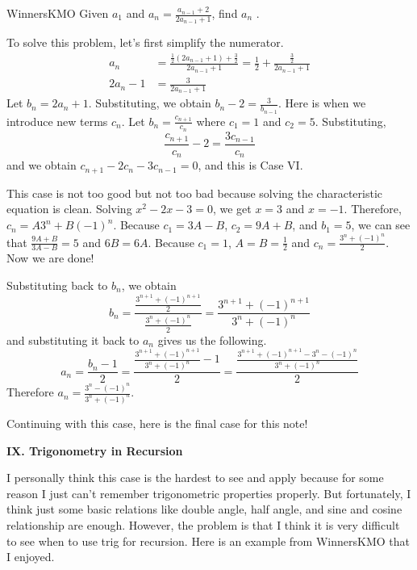 \documentclass[../../../main.tex]{subfiles}
\begin{document}
\begin{problem}{WinnersKMO}{}
Given $a_1$ and $a_n = \frac{a_{n-1} + 2}{2a_{n-1} + 1}$, find $a_n$
\cite{MATH01-5}.
\end{problem}
\begin{solution}
To solve this problem, let's first simplify the numerator.
\begin{align*}
    a_n
    &= \frac{ \frac{1}{2} (2a_{n-1} + 1) + \frac{3}{2} }{2a_{n-1} + 1}
    = \frac{1}{2} + \frac{\frac{3}{2}}{2a_{n-1} + 1} \\
    2a_n - 1 &= \frac{3}{2a_{n-1} + 1}
\end{align*}
Let $b_n = 2a_n + 1$. Substituting, we obtain $b_n - 2 =
\frac{3}{b_{n-1}}$. Here is when we introduce new terms $c_n$.
Let $b_n = \frac{c_{n+1}}{c_n}$ where $c_1 = 1$ and $c_2 = 5$.
Substituting,
\[
\frac{c_{n+1}}{c_n} - 2 = \frac{3c_{n-1}}{c_n}
\]
and we obtain $c_{n+1} - 2c_n - 3c_{n-1} = 0$, and this is Case VI.

This case is not too good but not too bad because solving the
characteristic equation is clean. Solving $x^2 - 2x - 3 = 0$,
we get $x = 3$ and $x = -1$. Therefore, $c_n = A3^n + B(-1)^n$.
Because $c_1 = 3A - B$, $c_2 = 9A + B$, and $b_1 = 5$, we can
see that $\frac{9A + B}{3A - B} = 5$ and $6B = 6A$.
Because $c_1 = 1$, $A = B = \frac{1}{2}$ and
$c_n = \frac{3^n + (-1)^n}{2}$. Now we are done!

Substituting back to $b_n$, we obtain
\[
b_n
= \frac{ \frac{3^{n+1} + (-1)^{n+1}}{2} }{ \frac{3^n + (-1)^n}{2} }
= \frac{3^{n+1} + (-1)^{n+1}}{3^n + (-1)^n}
\]
and substituting it back to $a_n$ gives us the following.
\[
a_n
= \frac{b_n - 1}{2}
= \frac{ \frac{3^{n+1} + (-1)^{n+1}}{3^n + (-1)^n} - 1 }{2}
= \frac{ \frac{3^{n+1} + (-1)^{n+1} - 3^n - (-1)^n}{3^n + (-1)^n} }{2}
\]
Therefore $a_n = \frac{3^n - (-1)^n}{3^n + (-1)^n}$.
\end{solution}

Continuing with this case, here is the final case for this note!

{\Large\textcolor{BrickRed}{\textbf{IX. Trigonometry in Recursion}}}

I personally think this case is the hardest to see and apply because
for some reason I just can't remember trigonometric properties
properly. But fortunately, I think just some basic relations like
double angle, half angle, and sine and cosine relationship are enough.
However, the problem is that I think it is very difficult to see
when to use trig for recursion. Here is an example from WinnersKMO
\cite{MATH01-5} that I enjoyed.
\end{document}
